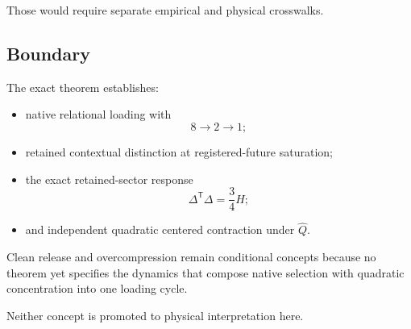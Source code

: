 Those would require separate empirical and physical crosswalks.

\subsection{Boundary}


The exact theorem establishes:

\begin{itemize}

\item native relational loading with
\[
8\to2\to1;
\]

\item retained contextual distinction at registered-future
saturation;

\item the exact retained-sector response
\[
\Delta^{\mathsf T}\Delta=\frac34H;
\]

\item and independent quadratic centered contraction under
\(\widehat Q\).

\end{itemize}

Clean release and overcompression remain conditional concepts because
no theorem yet specifies the dynamics that compose native selection
with quadratic concentration into one loading cycle.

Neither concept is promoted to physical interpretation here.
